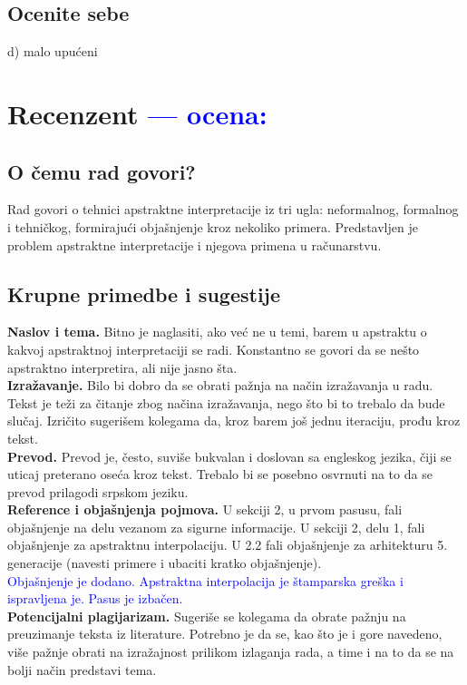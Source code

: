 \documentclass[a4paper]{report}
\newcommand{\odgovor}[1]{\textcolor{blue}{#1}}
\begin{document}
\section{Ocenite sebe}
d) malo upućeni 


\chapter{Recenzent \odgovor{--- ocena:} }


\section{O čemu rad govori?}
Rad govori o tehnici apstraktne interpretacije iz tri ugla: neformalnog, formalnog i tehničkog, formirajući objašnjenje kroz nekoliko primera. Predstavljen je problem apstraktne interpretacije i njegova primena u računarstvu.
 
\section{Krupne primedbe i sugestije}

\textbf{Naslov i tema.} Bitno je naglasiti, ako već ne u temi, barem u apstraktu o kakvoj apstraktnoj interpretaciji se radi. Konstantno se govori da se nešto apstraktno interpretira, ali nije jasno šta.\\ 
\textbf{Izražavanje.} Bilo bi dobro da se obrati pažnja na način izražavanja u radu. Tekst je teži za čitanje zbog načina izražavanja, nego što bi to trebalo da bude slučaj. Izričito sugerišem kolegama da, kroz barem još jednu iteraciju, prođu kroz tekst.\\ 
\textbf{Prevod.} Prevod je, često, suviše bukvalan i doslovan sa engleskog jezika, čiji se uticaj preterano oseća kroz tekst. Trebalo bi se posebno osvrnuti na to da se prevod prilagodi srpskom jeziku.\\
\textbf{Reference i objašnjenja pojmova.} U sekciji 2, u prvom pasusu, fali objašnjenje na delu vezanom za sigurne informacije. U sekciji 2, delu 1, fali objašnjenje za apstraktnu interpolaciju. U 2.2 fali objašnjenje za arhitekturu 5. generacije (navesti primere i ubaciti kratko objašnjenje).\\
\odgovor{Objašnjenje je dodano. Apstraktna interpolacija je štamparska greška i ispravljena je. Pasus je izbačen.}
\\
\textbf{Potencijalni plagijarizam.} Sugeriše se kolegama da obrate pažnju na preuzimanje teksta iz literature. Potrebno je da se, kao što je i gore navedeno, više pažnje obrati na izražajnost prilikom izlaganja rada, a time i na to da se na bolji način predstavi tema.
\end{document}

